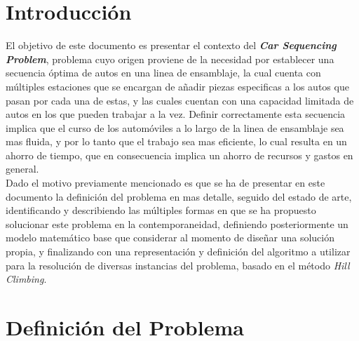 \documentclass[letter, 10pt]{article}
\begin{document}
\section{Introducción}
El objetivo de este documento es presentar el contexto del  \textit{\textbf{Car Sequencing Problem}}, problema cuyo origen proviene de la necesidad por establecer una secuencia óptima de autos en una linea de ensamblaje, la cual cuenta con múltiples estaciones que se encargan de añadir piezas especificas a los autos que pasan por cada una de estas, y las cuales cuentan con una capacidad limitada de autos en los que pueden trabajar a la vez. Definir correctamente esta secuencia implica que el curso de los automóviles a lo largo de la linea de ensamblaje sea mas fluida, y por lo tanto que el trabajo sea mas eficiente, lo cual resulta en un ahorro de tiempo, que en consecuencia implica un ahorro de recursos y gastos en general.\\
Dado el motivo previamente mencionado es que se ha de presentar en este documento la definición del problema en mas detalle, seguido del estado de arte, identificando y describiendo las múltiples formas en que se ha propuesto solucionar este problema en la contemporaneidad, definiendo posteriormente un modelo matemático base que considerar al momento de diseñar una solución propia, y finalizando con una representación y definición del algoritmo a utilizar para la resolución de diversas instancias del problema, basado en el método \textit{Hill Climbing}.



\section{Definición del Problema}
\end{document}
